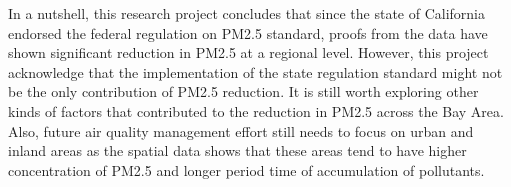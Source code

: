 \documentclass[12pt,]{article}
\begin{document}
In a nutshell, this research project concludes that since the state of
California endorsed the federal regulation on PM2.5 standard, proofs
from the data have shown significant reduction in PM2.5 at a regional
level. However, this project acknowledge that the implementation of the
state regulation standard might not be the only contribution of PM2.5
reduction. It is still worth exploring other kinds of factors that
contributed to the reduction in PM2.5 across the Bay Area. Also, future
air quality management effort still needs to focus on urban and inland
areas as the spatial data shows that these areas tend to have higher
concentration of PM2.5 and longer period time of accumulation of
pollutants.
\end{document}
